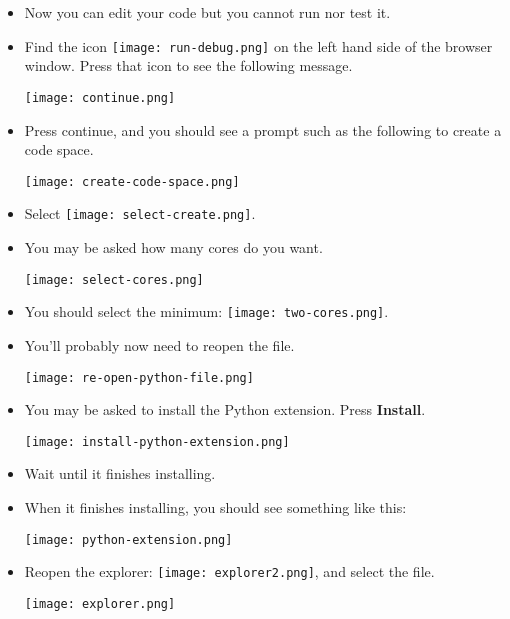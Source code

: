 \begin{itemize}

\item Now you can edit your code but you cannot run nor test it.

\item Find the icon \texttt{[image: run-debug.png]} on the left hand side of the browser window.   Press that icon to see the following message.

\noindent\texttt{[image: continue.png]}

\item Press continue, and you should see a prompt such as the following to create a code space.   

\noindent\texttt{[image: create-code-space.png]}

\item Select \texttt{[image: select-create.png]}.

\item You may be asked how many cores do you want.

\noindent\texttt{[image: select-cores.png]}

\item You should select the minimum: \texttt{[image: two-cores.png]}.

\item You'll probably now need to reopen the  file.

\noindent\texttt{[image: re-open-python-file.png]}

\item You may be asked to install the Python extension.  Press \textbf{Install}.

\noindent\texttt{[image: install-python-extension.png]}


\item Wait until it finishes installing.
  

\item When it finishes installing, you should see something like this:

\noindent\texttt{[image: python-extension.png]}

\item Reopen the explorer: \texttt{[image: explorer2.png]}, and select the  file.

\noindent\texttt{[image: explorer.png]}
\end{itemize}

